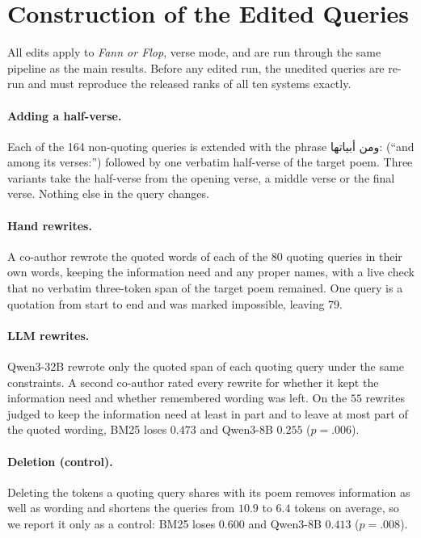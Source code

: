 \documentclass[11pt]{article}
\newcommand{\textarabic}[1]{\foreignlanguage{arabic}{#1}}
\begin{document}
\begin{table}[h]
\centering\scriptsize
\setlength{\tabcolsep}{2.5pt}

\caption{Verse-mode Recall@5 on \textit{Fann or Flop}, split at verbatim spans of $\geq$2 to $\geq$5 tokens. Subset sizes are given under each threshold.}
\label{tab:appthreshold}
\end{table}

\section{Construction of the Edited Queries}
\label{app:edits}
All edits apply to \textit{Fann or Flop}, verse mode, and are run through the same pipeline as the main results. Before any edited run, the unedited queries are re-run and must reproduce the released ranks of all ten systems exactly.

\paragraph{Adding a half-verse.} Each of the 164 non-quoting queries is extended with the phrase \textarabic{ومن أبياتها:} (``and among its verses:'') followed by one verbatim half-verse of the target poem. Three variants take the half-verse from the opening verse, a middle verse or the final verse. Nothing else in the query changes.

\paragraph{Hand rewrites.} A co-author rewrote the quoted words of each of the 80 quoting queries in their own words, keeping the information need and any proper names, with a live check that no verbatim three-token span of the target poem remained. One query is a quotation from start to end and was marked impossible, leaving 79.

\paragraph{LLM rewrites.} Qwen3-32B rewrote only the quoted span of each quoting query under the same constraints. A second co-author rated every rewrite for whether it kept the information need and whether remembered wording was left. On the $55$ rewrites judged to keep the information need at least in part and to leave at most part of the quoted wording, BM25 loses $0.473$ and Qwen3-8B $0.255$ ($p{=}.006$).

\paragraph{Deletion (control).} Deleting the tokens a quoting query shares with its poem removes information as well as wording and shortens the queries from $10.9$ to $6.4$ tokens on average, so we report it only as a control: BM25 loses $0.600$ and Qwen3-8B $0.413$ ($p{=}.008$).
\end{document}
